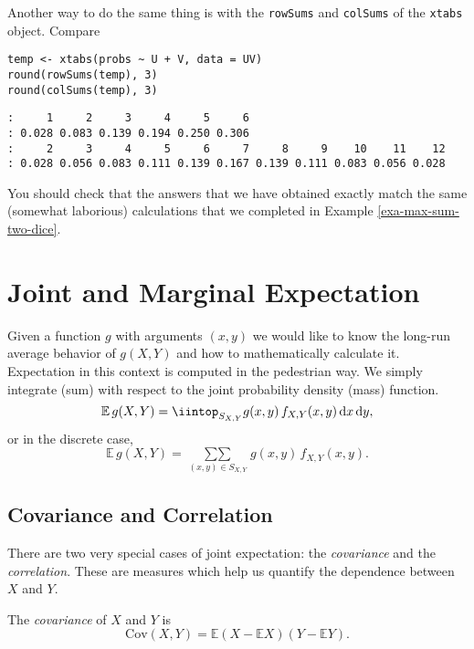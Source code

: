 Another way to do the same thing is with the \texttt{rowSums} and \texttt{colSums}
of the \texttt{xtabs} object. Compare

\begin{Verbatim}
temp <- xtabs(probs ~ U + V, data = UV)
round(rowSums(temp), 3)
round(colSums(temp), 3)
\end{Verbatim}

\begin{verbatim}
:     1     2     3     4     5     6
: 0.028 0.083 0.139 0.194 0.250 0.306
:     2     3     4     5     6     7     8     9    10    11    12
: 0.028 0.056 0.083 0.111 0.139 0.167 0.139 0.111 0.083 0.056 0.028
\end{verbatim}

You should check that the answers that we have obtained exactly match
the same (somewhat laborious) calculations that we completed in
Example \ref{exa-max-sum-two-dice}.

\section{Joint and Marginal Expectation}
\label{sec-7-2}

Given a function \(g\) with arguments \((x,y)\) we would like to know
the long-run average behavior of \(g(X,Y)\) and how to mathematically
calculate it. Expectation in this context is computed in the
pedestrian way. We simply integrate (sum) with respect to the joint
probability density (mass) function.
\begin{equation}
\mathbb{E}\, g(X,Y)=\iintop_{S_{X,Y}}g(x,y)\, f_{X,Y}(x,y)\,\mathrm{d} x\,\mathrm{d} y,
\end{equation}
or in the discrete case,
\begin{equation}
\mathbb{E}\, g(X,Y)=\mathop{\sum\sum}\limits _{(x,y)\in S_{X,Y}}g(x,y)\, f_{X,Y}(x,y).
\end{equation}

\subsection{Covariance and Correlation}
\label{sec-7-2-1}

There are two very special cases of joint expectation: the
\emph{covariance} and the \emph{correlation}. These are measures which help us
quantify the dependence between \(X\) and \(Y\).

\begin{defn}
The \emph{covariance} of \(X\) and \(Y\) is
\begin{equation}
\mbox{Cov}(X,Y)=\mathbb{E}(X-\mathbb{E} X)(Y-\mathbb{E} Y).
\end{equation}
\end{defn}

